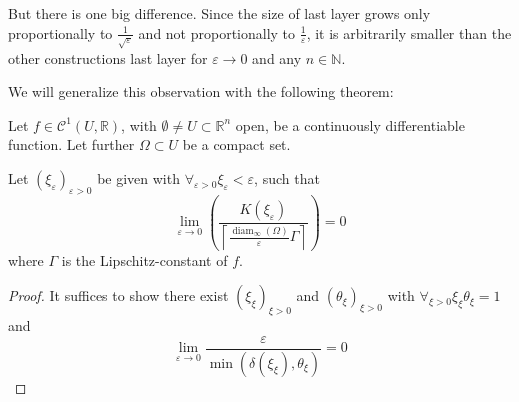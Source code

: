But there is one big difference. Since the size of last layer grows only proportionally to \(\frac{1}{\sqrt{ε}}\) and not proportionally to \(\frac{1}{ε}\), it is arbitrarily smaller than the other constructions last layer for \(ε→0\) and any \(n∈ℕ\).

We will generalize this observation with the following theorem:
\begin{theorem}
  Let \(f∈𝒞^1(U,ℝ)\), with \(∅≠U⊂ℝ^n\) open, be a continuously differentiable function. Let further \(Ω⊂U\) be a compact set.

  Let \((ξ_{ε})_{ε>0}\) be given with \(∀_{ε>0}ξ_{ε}<ε\), such that
  \[ \lim_{ε→0}\left(\frac{K(ξ_{ε})}{\left\lceil\frac{\operatorname{diam}_∞(Ω)}{ε}Γ\right\rceil}\right)=0 \]
  where \(Γ\) is the Lipschitz-constant of \(f\).
\end{theorem}

\begin{proof}
  It suffices to show there exist \((ξ_{ξ})_{ξ>0}\) and \((θ_{ξ})_{ξ>0}\) with \(∀_{ξ>0}ξ_{ξ}θ_{ξ}=1\) and
  \[ \lim_{ε→0}\frac{ε}{\min(δ(ξ_{ξ}),θ_{ξ})}=0 \]
\end{proof}



